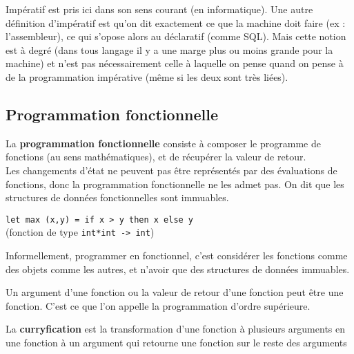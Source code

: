 \begin{rem}
	Impératif est pris ici dans son sens courant (en informatique). Une autre définition d'impératif est qu'on dit exactement ce que la machine doit faire (ex : l'assembleur), ce qui s'opose alors au déclaratif (comme SQL). Mais cette notion est à degré (dans tous langage il y a une marge plus ou moins grande pour la machine) et n'est pas nécessairement celle à laquelle on pense quand on pense à de la programmation impérative (même si les deux sont très liées).
\end{rem}

\subsection{Programmation fonctionnelle}

\begin{definition}
	La \textbf{programmation fonctionnelle} consiste à composer le programme de fonctions
	(au sens mathématiques), et de récupérer la valeur de retour.\\
	Les changements d'état ne peuvent pas être représentés par des évaluations de fonctions, donc la programmation fonctionnelle ne les admet pas. On dit que les structures de données fonctionnelles sont immuables.
\end{definition}

\begin{example}
		\lstinline|let max (x,y) = if x > y then x else y| \\ (fonction de type \lstinline|int*int -> int|) \label{2-1}
\end{example}

Informellement, programmer en fonctionnel, c'est considérer les fonctions comme des objets comme les autres, et n'avoir que des structures de données immuables.

\begin{rem}
	Un argument d'une fonction ou la valeur de retour d'une fonction peut être une fonction. C'est ce que l'on appelle la  programmation d'ordre supérieure.
\end{rem}


\begin{definition}
	La \textbf{curryfication} est la transformation d'une fonction à plusieurs arguments en une fonction à un argument qui retourne une fonction sur le reste des arguments
\end{definition}

